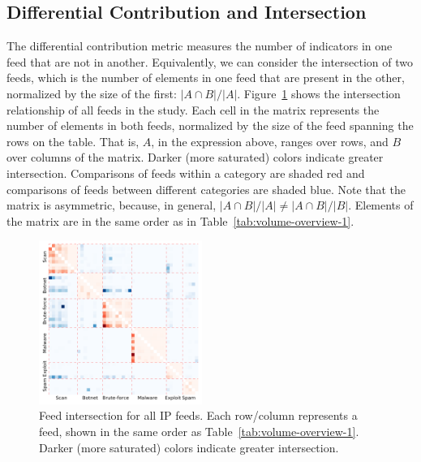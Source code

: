 \subsection{Differential Contribution and Intersection}
\label{sec:ip-overlap}

The differential contribution metric measures the number of indicators in one feed that are not in another. Equivalently, we can consider the intersection of two feeds, which is the number of elements in one feed that are present in the other, normalized by the size of the first: $|A\cap B|/|A|$. Figure~\ref{fig:overall_heatmap} shows the intersection relationship of all feeds in the study. Each cell in the matrix represents the number of elements in both feeds, normalized by the size of the feed spanning the rows on the table. That is, $A$, in the expression above, ranges over rows, and $B$ over columns of the matrix. Darker (more saturated) colors indicate greater intersection. Comparisons of feeds within a category are shaded red and comparisons of feeds between different categories are shaded blue. Note that the matrix is asymmetric, because, in general, $|A\cap B|/|A| \neq |A\cap B|/|B|$. Elements of the matrix are in the same order as in Table~\ref{tab:volume-overview-1}.

\begin{figure}
\centering
\includegraphics[width=0.475\textwidth]{images/overall_heatmap.pdf}
\caption{Feed intersection for all IP feeds. Each row/column represents a feed, shown in the same order as Table~\ref{tab:volume-overview-1}. Darker (more saturated) colors indicate greater intersection.}
\label{fig:overall_heatmap}
\end{figure}


